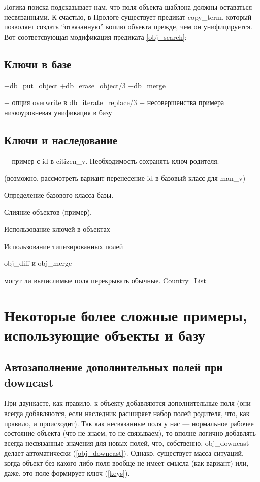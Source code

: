 \documentclass[a4paper]{book}
\begin{document}
Логика поиска подсказывает нам, что поля объекта-шаблона должны
оставаться несвязанными. К счастью, в Прологе существует предикат
copy_term, который позволяет создать ``отвязанную'' копию объекта
прежде, чем он унифицируется. Вот соответсвующая модификация
предиката \ref{obj_search}:

\begin{example}{}{}
\end{example}




\subsection{Ключи в базе}

+db_put_object
+db_erase_object/3
+db_merge

+ опция overwrite в db_iterate_replace/3 + несовершенства примера
низкоуровневая унификация в базу


\subsection{Ключи и наследование}
\label{keys_inheritance}

+ пример с id в citizen_v. Необходимость сохранять ключ родителя.

(возможно, рассмотреть вариант перенесение id в базовый класс для
man_v)

Определение базового класса базы.

Слияние объектов (пример).


Использование ключей в объектах

Использование типизированных полей

obj_diff и obj_merge

могут ли вычислимые поля перекрывать обычные. Country_List

\section{Некоторые более сложные примеры, использующие объекты и
  базу}

\subsection{Автозаполнение дополнительных полей при downcast}

При даункасте, как правило, к объекту добавляются дополнительные
поля (они всегда добавляются, если наследник расширяет набор
полей родителя, что, как правило, и происходит). Так как
несвязанные поля у нас --- нормальное рабочее состояние объекта
(что не знаем, то не связываем), то вполне логично добавлять
всегда несвязанные значения для новых полей, что, собственно,
obj_downcast делает автоматически (\ref{obj_downcast}). Однако,
существует масса ситуаций, когда объект без какого-либо поля
вообще не имеет смысла (как вариант) или, даже, это поле
формирует ключ (\ref{keys}).
\end{document}
